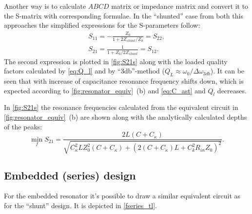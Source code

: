 \documentclass[12pt]{report}
\numberwithin{equation}{section}
\begin{document}
Another way is to calculate $ABCD$ matrix or impedance matrix and convert it to the S-matrix with corresponding formulae\cite{pozar2012}. In the ``shunted'' case from both this approaches the simplified expressions for the S-parameters follow:
\begin{gather}
S_{11} = -\frac{Z_0}{1 + 2Z_{shunt}/Z_0} = S_{22}, \\
S_{21} = \frac{1}{1+Z_0/2Z_{shunt}} = S_{12}. \label{eq:S21}
\end{gather}
The second expression is plotted in \autoref{fig:S21s} along with the loaded quality factors calculated by \eqref{eq:Q_l} and by ``3db''-method ($Q_L \approx \omega_0/\Delta\omega_{3db}$). It can be seen that with increase of capacitance resonance frequency shifts down, which is expected according to \autoref{fig:resonator_equiv}~(b) and \eqref{eq:C_ast} and $Q_l$ decreases.

In \autoref{fig:S21s} the resonance frequencies calculated from the equivalent circuit in \autoref{fig:resonator_equiv}~(b) are shown along with the analytically calculated depths of the peaks:
\begin{equation}
\min_f S_{21} = \frac{2 L \left(C + C_{\kappa}\right)}{\sqrt{C_{\kappa}^{2} L Z_{0}^{2} \left(C + C_{\kappa}\right) + \left(2 (C+C_\kappa) L + C_{k}^{2} R_{in} Z_{0} \right)^{2}}}.
\end{equation}

\subsection{Embedded (series) design}

For the embedded resonator it's possible to draw a similar equivalent circuit as for the ``shunt'' design\cite{Goppl2008}. It is depicted in \autoref{fseries_tl}. 
\end{document}
